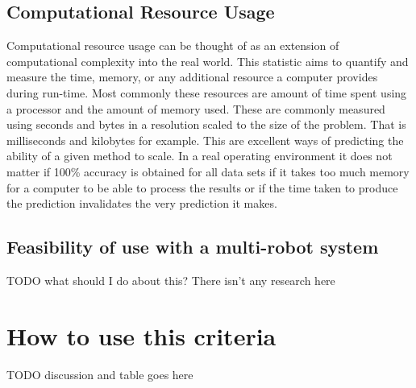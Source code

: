  \subsection{ Computational Resource Usage }
  Computational resource usage can be thought of as an extension of computational
  complexity into the real world. This statistic aims to quantify and measure
  the time, memory, or any additional resource a computer provides during run-time.
  Most commonly these resources are amount of time spent using a processor
  and the amount of memory used. These are commonly measured using seconds and
  bytes in a resolution scaled to the size of the problem. That is milliseconds
  and kilobytes for example. This are excellent ways of predicting the ability
  of a given method to scale. In a real operating environment it does not matter
  if 100\% accuracy is obtained for all data sets if it takes too much memory
  for a computer to be able to process the results or if the time taken to
  produce the prediction invalidates the very prediction it makes.


  \subsection{ Feasibility of use with a multi-robot system }
  TODO what should I do about this? There isn't any research here


  \section{ How to use this criteria }
  TODO discussion and table goes here





